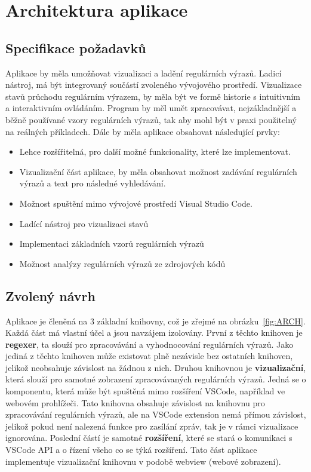 \chapter{Architektura aplikace}\label{sec:ApplicationTechnology}

\section{Specifikace požadavků}

Aplikace by měla umožňovat vizualizaci a ladění regulárních výrazů.
Ladicí nástroj, má být integrovaný součástí zvoleného vývojového prostředí.
Vizualizace stavů průchodu regulárním výrazem, by měla být ve formě historie s intuitivním a interaktivním ovládáním.
Program by měl umět zpracovávat, nejzákladnější a běžně používané vzory regulárních výrazů, tak aby mohl být v praxi použitelný na reálných příkladech.
Dále by měla aplikace obsahovat následující prvky:
\begin{itemize}
	\item Lehce rozšířitelná, pro další možné funkcionality, které lze implementovat.
	\item Vizualizační část aplikace, by měla obsahovat možnost zadávání regulárních výrazů a text pro následné vyhledávání.
	\item Možnost spuštění mimo vývojové prostředí Visual Studio Code.
	\item Ladící nástroj pro vizualizaci stavů
	\item Implementaci základních vzorů regulárních výrazů
	\item Možnost analýzy regulárních výrazů ze zdrojových kódů
\end{itemize}

\section{Zvolený návrh}

Aplikace je členěná na 3 základní knihovny, což je zřejmé na obrázku~\ref{fig:ARCH}.
Každá část má vlastní účel a jsou navzájem izolovány.
První z těchto knihoven je \textbf{regexer}, ta slouží pro zpracovávání a vyhodnocování regulárních výrazů.
Jako jediná z těchto knihoven může existovat plně nezávisle bez ostatních knihoven, jelikož neobsahuje závislost na žádnou z nich.
Druhou knihovnou je \textbf{vizualizační}, která slouží pro samotné zobrazení zpracovávaných regulárních výrazů.
Jedná se o komponentu, která může být spuštěná mimo rozšíření VSCode, například ve webovém prohlížeči.
Tato knihovna obsahuje závislost na knihovnu pro zpracovávání regulárních výrazů, ale na VSCode extension nemá přímou závislost, jelikož pokud není nalezená funkce pro zasílání zpráv, tak je v rámci vizualizace ignorována.
Poslední částí je samotné \textbf{rozšíření}, které se stará o komunikaci s VSCode API a o řízení všeho co se týká rozšíření.
Tato část aplikace implementuje vizualizační knihovnu v podobě webview (webové zobrazení).

